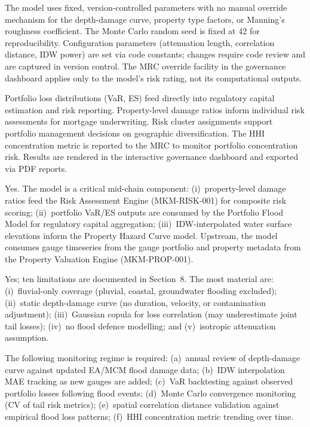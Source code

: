 \documentclass[11pt,a4paper]{article}
\begin{document}
The model uses fixed, version-controlled parameters with no manual override mechanism for the depth-damage curve, property type factors, or Manning's roughness coefficient. The Monte Carlo random seed is fixed at 42 for reproducibility. Configuration parameters (attenuation length, correlation distance, IDW power) are set via code constants; changes require code review and are captured in version control. The MRC override facility in the governance dashboard applies only to the model's risk rating, not its computational outputs.

Portfolio loss distributions (VaR, ES) feed directly into regulatory capital estimation and risk reporting. Property-level damage ratios inform individual risk assessments for mortgage underwriting. Risk cluster assignments support portfolio management decisions on geographic diversification. The HHI concentration metric is reported to the MRC to monitor portfolio concentration risk. Results are rendered in the interactive governance dashboard and exported via PDF reports.

Yes. The model is a critical mid-chain component: (i)~property-level damage ratios feed the Risk Assessment Engine (MKM-RISK-001) for composite risk scoring; (ii)~portfolio VaR/ES outputs are consumed by the Portfolio Flood Model for regulatory capital aggregation; (iii)~IDW-interpolated water surface elevations inform the Property Hazard Curve model. Upstream, the model consumes gauge timeseries from the gauge portfolio and property metadata from the Property Valuation Engine (MKM-PROP-001).

Yes; ten limitations are documented in Section~8. The most material are: (i)~fluvial-only coverage (pluvial, coastal, groundwater flooding excluded); (ii)~static depth-damage curve (no duration, velocity, or contamination adjustment); (iii)~Gaussian copula for loss correlation (may underestimate joint tail losses); (iv)~no flood defence modelling; and (v)~isotropic attenuation assumption.

The following monitoring regime is required: (a)~annual review of depth-damage curve against updated EA/MCM flood damage data; (b)~IDW interpolation MAE tracking as new gauges are added; (c)~VaR backtesting against observed portfolio losses following flood events; (d)~Monte Carlo convergence monitoring (CV of tail risk metrics); (e)~spatial correlation distance validation against empirical flood loss patterns; (f)~HHI concentration metric trending over time.
\end{document}

